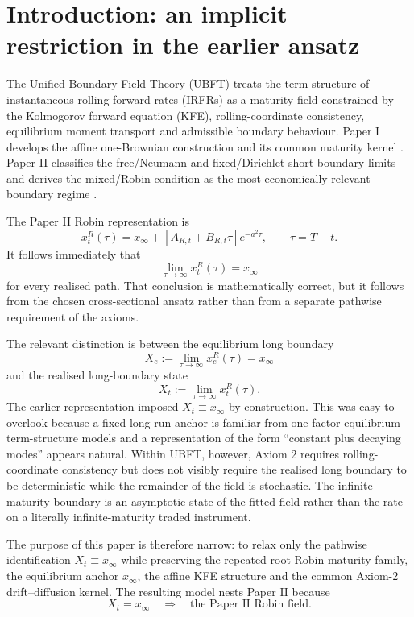 \documentclass[11pt]{article}
\numberwithin{equation}{section}
\begin{document}
\section{Introduction: an implicit restriction in the earlier ansatz}

The Unified Boundary Field Theory (UBFT) treats the term structure of instantaneous rolling forward rates (IRFRs) as a maturity field constrained by the Kolmogorov forward equation (KFE), rolling-coordinate consistency, equilibrium moment transport and admissible boundary behaviour. Paper I develops the affine one-Brownian construction and its common maturity kernel \cite{OzaIRFR}. Paper II classifies the free/Neumann and fixed/Dirichlet short-boundary limits and derives the mixed/Robin condition as the most economically relevant boundary regime \cite{OzaShortBoundary}.

The Paper II Robin representation is
\begin{equation}
 x_t^R(\tau)=x_\infty+[A_{R,t}+B_{R,t}\tau]e^{-a^2\tau},
 \qquad \tau=T-t.
\end{equation}
It follows immediately that
\begin{equation}
 \lim_{\tau\to\infty}x_t^R(\tau)=x_\infty
\end{equation}
for every realised path. That conclusion is mathematically correct, but it follows from the chosen cross-sectional ansatz rather than from a separate pathwise requirement of the axioms.

The relevant distinction is between the equilibrium long boundary
\begin{equation}
 X_e:=\lim_{\tau\to\infty}x_e^R(\tau)=x_\infty
\end{equation}
and the realised long-boundary state
\begin{equation}
 X_t:=\lim_{\tau\to\infty}x_t^R(\tau).
\end{equation}
The earlier representation imposed $X_t\equiv x_\infty$ by construction. This was easy to overlook because a fixed long-run anchor is familiar from one-factor equilibrium term-structure models and a representation of the form ``constant plus decaying modes'' appears natural. Within UBFT, however, Axiom 2 requires rolling-coordinate consistency but does not visibly require the realised long boundary to be deterministic while the remainder of the field is stochastic. The infinite-maturity boundary is an asymptotic state of the fitted field rather than the rate on a literally infinite-maturity traded instrument.

The purpose of this paper is therefore narrow: to relax only the pathwise identification $X_t\equiv x_\infty$ while preserving the repeated-root Robin maturity family, the equilibrium anchor $x_\infty$, the affine KFE structure and the common Axiom-2 drift--diffusion kernel. The resulting model nests Paper II because
\begin{equation}
 X_t=x_\infty
 \quad\Longrightarrow\quad
 \text{the Paper II Robin field}.
 \label{eq:paper2nestingintro}
\end{equation}
\end{document}
